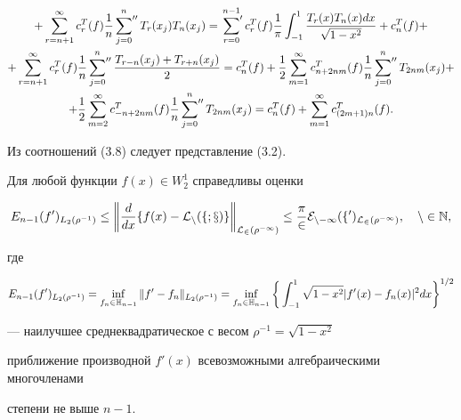 \begin{pf}
\begin{multline}
% 


+\sum_{r=n+1}^\infty c_r^T(f)\frac{1}{n}\sideset{}{''}\sum_{j=0}^n


T_r(x_j)T_n(x_j)=\sideset{}{'}\sum_{r=0}^{n-1}c_r^T(f)\frac{1}{\pi}


\int_{-1}^1\frac{T_r(x)T_n(x)dx}{\sqrt{1-x^2}}+c_n^T(f)+ \\


%


+\sum_{r=n+1}^\infty c_r^T(f) \frac{1}{n}\sideset{}{''}\sum_{j=0}^n


\frac{T_{r-n}(x_j)+T_{r+n}(x_j)}{2}=


c_n^T(f)+\frac{1}{2}\sum_{m=1}^\infty c_{n+2nm}^T(f)\frac{1}{n}


\sideset{}{''}\sum_{j=0}^n T_{2nm}(x_j)+ \\


%


+\frac{1}{2}\sum_{m=2}^\infty c_{-n+2nm}^T(f)\frac{1}{n}


\sideset{}{''}\sum_{j=0}^n T_{2nm}(x_j)=


c_n^T(f)+\sum_{m=1}^\infty c_{(2m+1)n}^T(f).


\end{multline}


Из соотношений (3.8) следует представление (3.2).


\end{pf}








\begin{lem}


Для любой функции $f(x)\in W_2^1$ справедливы оценки


\begin{equation}


E_{n-1}(f')_{L_2(\rho^{-1})}\le \bigg\|


\frac{d}{dx}\{f(x)-\cal{L}_n(f;x)\}


\bigg\|_{L_2(\rho^{-1})}\le \frac{\pi}{2}E_{n-1}(f')_{L_2(\rho^{-1})},\quad


n\in \N,


\end{equation}


где


$$


E_{n-1}(f')_{L_2(\rho^{-1})}=\inf_{f_n\in \bH_{n-1}}


\|f'-f_n\|_{L_2(\rho^{-1})}=\infl_{f_n\in\bH_{n-1}}\bigg\{


\int_{-1}^1\sqrt{1-x^2}|f'(x)-f_n(x)|^2dx\bigg\}^{1/2}


$$


--- наилучшее среднеквадратическое с весом $\rho^{-1}=\sqrt{1-x^2}$ 


приближение производной $f'(x)$ всевозможными алгебраическими многочленами 


степени не выше $n-1$.


\end{lem}








